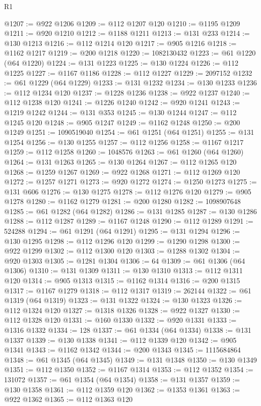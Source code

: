 \begin{lexlean}{R1}
\begin{coremodule}
@1207 := @922 @1206
@1209 := @112 @1207 @120
@1210 := @1195 @1209
@1211 := @920 @1210
@1212 := @1188 @1211
@1213 := @131 @233
@1214 := @130 @1213
@1216 := @112 @1214 @120
@1217 := @905 @1216
@1218 := @1162 @1217
@1219 := @200 @1218
@1220 := 1082130432
@1223 := @61 @1220 (@64 @1220)
@1224 := @131 @1223
@1225 := @130 @1224
@1226 := @112 @1225
@1227 := @1167 @1186
@1228 := @112 @1227
@1229 := 2097152
@1232 := @61 @1229 (@64 @1229)
@1233 := @131 @1232
@1234 := @130 @1233
@1236 := @112 @1234 @120
@1237 := @1228 @1236
@1238 := @922 @1237
@1240 := @112 @1238 @120
@1241 := @1226 @1240
@1242 := @920 @1241
@1243 := @1219 @1242
@1244 := @131 @353
@1245 := @130 @1244
@1247 := @112 @1245 @120
@1248 := @905 @1247
@1249 := @1162 @1248
@1250 := @200 @1249
@1251 := 1090519040
@1254 := @61 @1251 (@64 @1251)
@1255 := @131 @1254
@1256 := @130 @1255
@1257 := @112 @1256
@1258 := @1167 @1217
@1259 := @112 @1258
@1260 := 1048576
@1263 := @61 @1260 (@64 @1260)
@1264 := @131 @1263
@1265 := @130 @1264
@1267 := @112 @1265 @120
@1268 := @1259 @1267
@1269 := @922 @1268
@1271 := @112 @1269 @120
@1272 := @1257 @1271
@1273 := @920 @1272
@1274 := @1250 @1273
@1275 := @131 @606
@1276 := @130 @1275
@1278 := @112 @1276 @120
@1279 := @905 @1278
@1280 := @1162 @1279
@1281 := @200 @1280
@1282 := 1098907648
@1285 := @61 @1282 (@64 @1282)
@1286 := @131 @1285
@1287 := @130 @1286
@1288 := @112 @1287
@1289 := @1167 @1248
@1290 := @112 @1289
@1291 := 524288
@1294 := @61 @1291 (@64 @1291)
@1295 := @131 @1294
@1296 := @130 @1295
@1298 := @112 @1296 @120
@1299 := @1290 @1298
@1300 := @922 @1299
@1302 := @112 @1300 @120
@1303 := @1288 @1302
@1304 := @920 @1303
@1305 := @1281 @1304
@1306 := 64
@1309 := @61 @1306 (@64 @1306)
@1310 := @131 @1309
@1311 := @130 @1310
@1313 := @112 @1311 @120
@1314 := @905 @1313
@1315 := @1162 @1314
@1316 := @200 @1315
@1317 := @1167 @1279
@1318 := @112 @1317
@1319 := 262144
@1322 := @61 @1319 (@64 @1319)
@1323 := @131 @1322
@1324 := @130 @1323
@1326 := @112 @1324 @120
@1327 := @1318 @1326
@1328 := @922 @1327
@1330 := @112 @1328 @120
@1331 := @160 @1330
@1332 := @920 @1331
@1333 := @1316 @1332
@1334 := 128
@1337 := @61 @1334 (@64 @1334)
@1338 := @131 @1337
@1339 := @130 @1338
@1341 := @112 @1339 @120
@1342 := @905 @1341
@1343 := @1162 @1342
@1344 := @200 @1343
@1345 := 1115684864
@1348 := @61 @1345 (@64 @1345)
@1349 := @131 @1348
@1350 := @130 @1349
@1351 := @112 @1350
@1352 := @1167 @1314
@1353 := @112 @1352
@1354 := 131072
@1357 := @61 @1354 (@64 @1354)
@1358 := @131 @1357
@1359 := @130 @1358
@1361 := @112 @1359 @120
@1362 := @1353 @1361
@1363 := @922 @1362
@1365 := @112 @1363 @120

\end{coremodule}
\end{lexlean}

